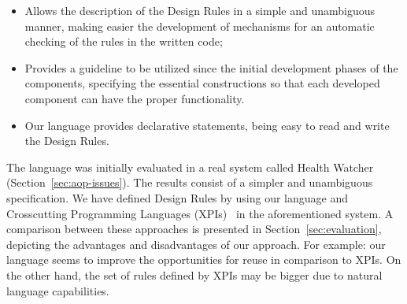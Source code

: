 \begin{itemize}

    \item Allows the description of the Design Rules in a simple and unambiguous manner,
    making easier the development of mechanisms for an automatic
    checking of the rules in the written code;

    \item Provides a guideline to be utilized since the initial development phases
    of the components, specifying the essential constructions so that each developed
    component can have the proper functionality.

    \item Our language provides declarative statements, being easy to read and write
    the Design Rules.

\end{itemize}

The language was initially evaluated in a real system called Health
Watcher~\cite{} (Section~\ref{sec:aop-issues}). The results consist
of a simpler and unambiguous specification. We have defined Design
Rules by using our language and Crosscutting Programming Languages
(XPIs)~\cite{sullivan-ieee-sw-2006} in the aforementioned system. A
comparison between these approaches is presented in
Section~\ref{sec:evaluation}, depicting the advantages and
disadvantages of our approach. For example: our language seems to
improve the opportunities for reuse in comparison to XPIs. On the
other hand, the set of rules defined by XPIs may be bigger due to
natural language capabilities.
